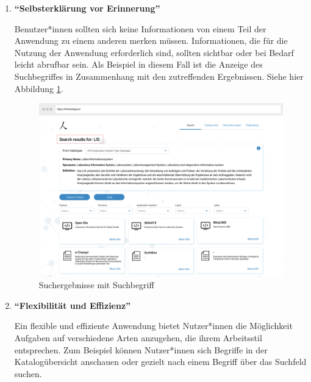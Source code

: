 \begin{enumerate}
\clearpage


\item \textbf{\enquote{Selbsterklärung vor Erinnerung}} \newline

Benutzer*innen sollten sich keine Informationen von einem Teil der Anwendung zu einem anderen merken müssen. 
Informationen, die für die Nutzung der Anwendung erforderlich sind, sollten sichtbar oder bei Bedarf leicht abrufbar sein.
Als Beispiel in diesem Fall ist die Anzeige des Suchbegriffes in Zusammenhang mit den zutreffenden Ergebnissen.
Siehe hier Abbildung \ref{fig:point6}.

\begin{figure}[H]
	\centering
    	\includegraphics[width=1.45\textwidth, angle=90]{Images/Mockup_Ergebnisseite_2}
   	\caption[Suchergebnisse mit Suchbegriff]{Suchergebnisse mit Suchbegriff}
   	\label{fig:point6}
\end{figure}



\item \textbf{\enquote{Flexibilität und Effizienz}} \newline

Ein flexible und effiziente Anwendung bietet Nutzer*innen die Möglichkeit Aufgaben auf verschiedene Arten anzugehen, die ihrem Arbeitsstil entsprechen.
Zum Beispiel können Nutzer*innen sich Begriffe in der Katalogübersicht anschauen oder gezielt nach einem Begriff über das Suchfeld suchen.


\end{enumerate}

